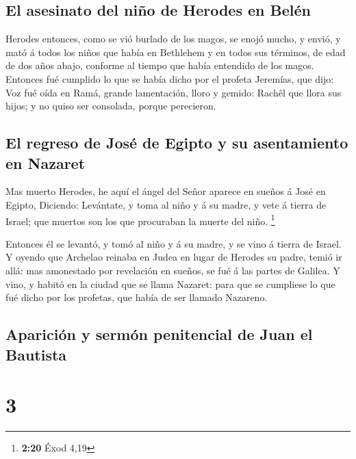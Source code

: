 \hypertarget{el-asesinato-del-niuxf1o-de-herodes-en-beluxe9n}{%
\subsection{El asesinato del niño de Herodes en
Belén}\label{el-asesinato-del-niuxf1o-de-herodes-en-beluxe9n}}

 Herodes entonces, como se vió burlado de los magos, se
enojó mucho, y envió, y mató á todos los niños que había en Bethlehem y
en todos sus términos, de edad de dos años abajo, conforme al tiempo que
había entendido de los magos.  Entonces fué cumplido lo que
se había dicho por el profeta Jeremías, que dijo:  Voz fué
oída en Ramá, grande lamentación, lloro y gemido: Rachêl que llora sus
hijos; y no quiso ser consolada, porque perecieron.

\hypertarget{el-regreso-de-josuxe9-de-egipto-y-su-asentamiento-en-nazaret}{%
\subsection{El regreso de José de Egipto y su asentamiento en
Nazaret}\label{el-regreso-de-josuxe9-de-egipto-y-su-asentamiento-en-nazaret}}

 Mas muerto Herodes, he aquí el ángel del Señor aparece en
sueños á José en Egipto,  Diciendo: Levántate, y toma al
niño y á su madre, y vete á tierra de Israel; que muertos son los que
procuraban la muerte del niño. \footnote{\textbf{2:20} Éxod 4,19}

 Entonces él se levantó, y tomó al niño y á su madre, y se
vino á tierra de Israel.  Y oyendo que Archelao reinaba en
Judea en lugar de Herodes su padre, temió ir allá: mas amonestado por
revelación en sueños, se fué á las partes de Galilea.  Y
vino, y habitó en la ciudad que se llama Nazaret: para que se cumpliese
lo que fué dicho por los profetas, que había de ser llamado Nazareno.

\hypertarget{apariciuxf3n-y-sermuxf3n-penitencial-de-juan-el-bautista}{%
\subsection{Aparición y sermón penitencial de Juan el
Bautista}\label{apariciuxf3n-y-sermuxf3n-penitencial-de-juan-el-bautista}}

\hypertarget{section-2}{%
\section{3}\label{section-2}}

